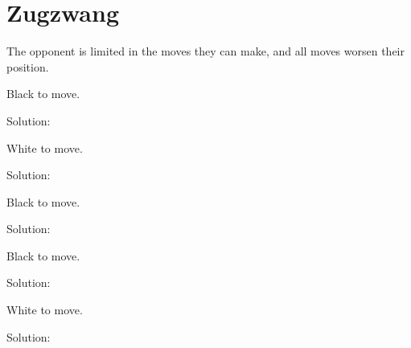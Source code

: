 \documentclass{book}
\begin{document}
\section{Zugzwang}
The opponent is limited in the moves they can make, and all moves worsen their position.\begin{multicols}{2} 
\begin{samepage} 
\newgame 


 
\showboard
 
 Black to move. 
 
Solution: 
 
\end{samepage}\begin{samepage} 
\newgame 


 
\showboard
 
 White to move. 
 
Solution: 
 
\end{samepage}\begin{samepage} 
\newgame 


 
\showboard
 
 Black to move. 
 
Solution: 
 
\end{samepage}\begin{samepage} 
\newgame 


 
\showboard
 
 Black to move. 
 
Solution: 
 
\end{samepage}\begin{samepage} 
\newgame 


 
\showboard
 
 White to move. 
 
Solution: 
 
\end{samepage}\begin{samepage} 
\newgame 


\end{samepage}
\end{multicols}
\end{document}
